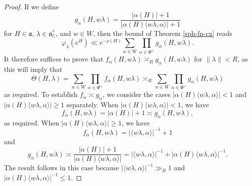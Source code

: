 \documentclass[12pt]{amsart}
\theoremstyle{remark}
\newcommand{\C}{\mathbb C}
\newcommand{\ga}{\mathfrak a}
\begin{document}
\begin{proof}
If we define
\[
g_\alpha(H,w\lambda) = \frac{|\alpha(H)|+1}{|\alpha(H) \langle w\lambda, \alpha \rangle| + 1}
\]
for $H \in \ga$, $\lambda \in \ga^*_\C$, and $w \in W$, then the bound of Theorem \ref{sph-fn-cx} reads
\[
\varphi_\lambda(e^H) \ll e^{-\rho(H)} \sum_{w \in W} \prod_{\alpha \in \Phi^+} g_\alpha(H,w\lambda).
\]
It therefore suffices to prove that $f_\alpha(H,w\lambda) \asymp_R g_\alpha(H,w\lambda)$ for $\| \lambda \| < R$, as this will imply that
\[
\Theta(H,\lambda) = \sum_{w \in W} \prod_{\alpha \in \Phi^+} f_\alpha(H,w\lambda) \asymp_R \sum_{w \in W} \prod_{\alpha \in \Phi^+} g_\alpha(H,w\lambda)
\]
as required.  To establish $f_\alpha \asymp g_\alpha$, we consider the cases $|\alpha(H) \langle w\lambda, \alpha \rangle| < 1$ and $|\alpha(H) \langle w\lambda, \alpha \rangle| \ge 1$ separately.  When $|\alpha(H) \langle w\lambda, \alpha \rangle| < 1$, we have
\[
f_\alpha(H,w\lambda) = |\alpha(H)| + 1 \asymp g_\alpha(H,w\lambda),
\]
as required.  When $|\alpha(H) \langle w\lambda, \alpha \rangle| \ge 1$, we have
\[
f_\alpha(H,w\lambda) = |\langle w\lambda, \alpha \rangle|^{-1} + 1
\]
and
\[
g_\alpha(H,w\lambda) \asymp \frac{|\alpha(H)|+1}{|\alpha(H) \langle w\lambda, \alpha \rangle|} = |\langle w\lambda, \alpha \rangle|^{-1} + |\alpha(H) \langle w\lambda, \alpha \rangle|^{-1}.
\]
The result follows in this case because $|\langle w\lambda, \alpha \rangle|^{-1} \gg_R 1$ and $|\alpha(H) \langle w\lambda, \alpha \rangle|^{-1} \le 1$.
\end{proof}

\appendix
\end{document}

